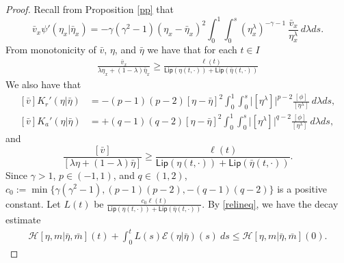 \documentclass[10pt, letterpaper]{article}
\def\E{{\mathcal{E}}}
\def\H{{\mathcal{H}}}
\def\Lip{{\textsf{Lip}}}
\def\kk{{L}}
\theoremstyle{definition}
\theoremstyle{remark}
\begin{document}
\begin{proof}
Recall from Proposition \ref{pp} that 
\begin{equation*}
 \bar{v}_x\psi'(\eta_x | \bar\eta_x) = -\gamma(\gamma^2-1) (\eta_x - \bar\eta_x)^2 \int_0^1\int_0^s (\eta^\lambda_x)^{-\gamma-1}~\frac{\bar{v}_x}{\eta^\lambda_x} \: d\lambda ds.
\end{equation*}
From monotonicity of $\bar{v}$, $\eta$, and $\bar\eta$ we have that for each $t\in I$
\begin{align*}
\frac{\bar{v}_x}{\lambda\eta_x + (1-\lambda)\bar\eta_x} \ge \frac{\ell(t)}{\Lip(\eta(t,\cdot)) + \Lip(\bar\eta(t,\cdot))}
\end{align*}
We also have that
\begin{equation} \label{relK}
\begin{aligned}
[\bar v] K_r'(\eta|\bar\eta)  &= -(p-1)(p-2)[\eta-\bar\eta]^2\int_0^1 \int_0^s \Big|[\eta^\lambda]\Big|^{p-2} \frac{[\phi]}{[\eta^\lambda]} \:d\lambda ds,\\
[\bar v] K_a'(\eta|\bar\eta)  &= +(q-1)(q-2)[\eta-\bar\eta]^2\int_0^1 \int_0^s \Big|[\eta^\lambda]\Big|^{q-2} \frac{[\phi]}{[\eta^\lambda]} \:d\lambda ds,
\end{aligned}
\end{equation}
and 
$$\frac{[\bar{v}]}{[\lambda \eta + (1-\lambda)\bar\eta]} \ge \frac{\ell(t)}{\Lip(\eta(t,\cdot)) + \Lip(\bar\eta(t,\cdot))}.$$
Since $\gamma>1$, $p\in(-1,1)$, and $q\in(1,2)$, $c_0:= \min\big\{\gamma(\gamma^2-1), (p-1)(p-2), -(q-1)(q-2)\big\}$ is a positive constant. Let $L(t)$ be $\frac{c_0\ell(t)}{\Lip(\eta(t,\cdot)) + \Lip(\bar\eta(t,\cdot))}$. By \eqref{relineq}, we have the decay estimate
\begin{align} 
 \H[\eta,m|\bar\eta,\bar{m}](t) + \int_{0}^t L(s)\E(\eta|\bar\eta)(s) \:ds \le \H[\eta,m|\bar\eta,\bar{m}](0).  
\end{align}


\end{proof}
\end{document}
